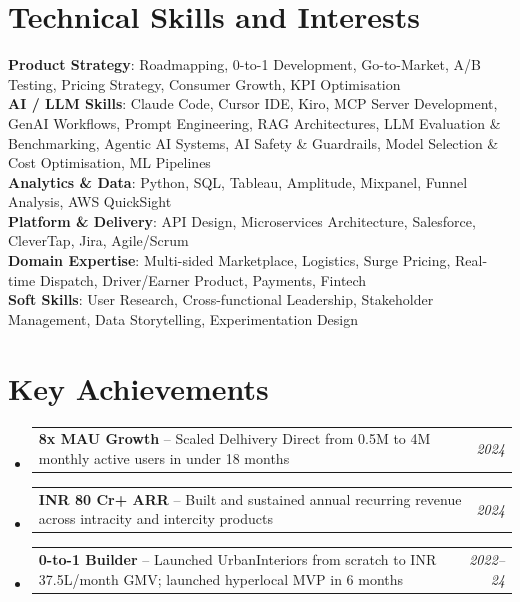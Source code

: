 \documentclass[a4paper,11pt]{article}
\makeatletter
\newcommand{\resumePOR}[3]{
\vspace{0.5mm}\item
    \begin{tabular*}{0.97\textwidth}[t]{l@{\extracolsep{\fill}}r}
        \textbf{#1}\hspace{0.3mm}#2 & \textit{\small{#3}} 
    \end{tabular*}
    \vspace{-2mm}
}
\newcommand{\resumeSubHeadingListStart}{\begin{itemize}[leftmargin=*,labelsep=0mm]}
\newcommand{\resumeSubHeadingListEnd}{\end{itemize}\vspace{2mm}}
\makeatother
\begin{document}
\section{\textbf{Technical Skills and Interests}}
 \begin{itemize}[leftmargin=0.05in, label={}]
    \small{\item{
     \textbf{Product Strategy}{: Roadmapping, 0-to-1 Development, Go-to-Market, A/B Testing, Pricing Strategy, Consumer Growth, KPI Optimisation } \\
     \textbf{AI / LLM Skills}{: Claude Code, Cursor IDE, Kiro, MCP Server Development, GenAI Workflows, Prompt Engineering, RAG Architectures, LLM Evaluation \& Benchmarking, Agentic AI Systems, AI Safety \& Guardrails, Model Selection \& Cost Optimisation, ML Pipelines }\\ 
     \textbf{Analytics \& Data}{: Python, SQL, Tableau, Amplitude, Mixpanel, Funnel Analysis, AWS QuickSight } \\ 
     \textbf{Platform \& Delivery}{: API Design, Microservices Architecture, Salesforce, CleverTap, Jira, Agile/Scrum } \\
     \textbf{Domain Expertise}{: Multi-sided Marketplace, Logistics, Surge Pricing, Real-time Dispatch, Driver/Earner Product, Payments, Fintech } \\  
     \textbf{Soft Skills}{: User Research, Cross-functional Leadership, Stakeholder Management, Data Storytelling, Experimentation Design } \\
    }}
 \end{itemize}
 \vspace{-16pt}



\section{\textbf{Key Achievements}}
\vspace{-0.4mm}
\resumeSubHeadingListStart
\resumePOR{8x MAU Growth } %
    {-- Scaled Delhivery Direct from 0.5M to 4M monthly active users in under 18 months} %
    {2024}
\resumePOR{INR 80 Cr+ ARR } %
    {-- Built and sustained annual recurring revenue across intracity and intercity products} %
    {2024}
\resumePOR{0-to-1 Builder } %
    {-- Launched UrbanInteriors from scratch to INR 37.5L/month GMV; launched hyperlocal MVP in 6 months} %
    {2022--24}
\resumeSubHeadingListEnd
\vspace{-5mm}



\end{document}
